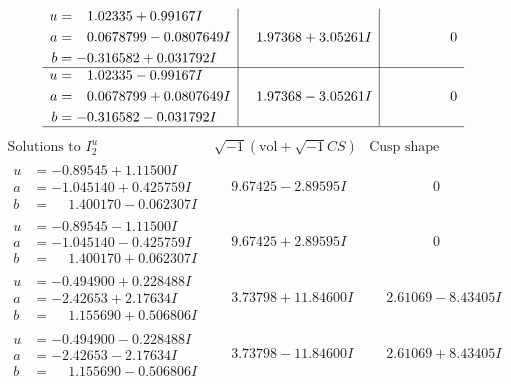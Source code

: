 \documentclass[1p]{elsarticle_modified}
\theoremstyle{definition}
\newcommand{\I}{\sqrt{-1}}
\begin{document}
$$\begin{array}{c|c|c}
\begin{aligned}
u &= \phantom{-}1.02335 + 0.99167 I \\
a &= \phantom{-}0.0678799 - 0.0807649 I \\
b &= -0.316582 + 0.031792 I\end{aligned}
 & \phantom{-}1.97368 + 3.05261 I & \phantom{-0.000000 } 0 \\ \hline\begin{aligned}
u &= \phantom{-}1.02335 - 0.99167 I \\
a &= \phantom{-}0.0678799 + 0.0807649 I \\
b &= -0.316582 - 0.031792 I\end{aligned}
 & \phantom{-}1.97368 - 3.05261 I & \phantom{-0.000000 } 0\\
 \hline 
 \end{array}$$\newpage$$\begin{array}{c|c|c}  
\text{Solutions to }I^u_{2}& \I (\text{vol} + \sqrt{-1}CS) & \text{Cusp shape}\\
 \hline 
\begin{aligned}
u &= -0.89545 + 1.11500 I \\
a &= -1.045140 + 0.425759 I \\
b &= \phantom{-}1.400170 - 0.062307 I\end{aligned}
 & \phantom{-}9.67425 - 2.89595 I & \phantom{-0.000000 } 0 \\ \hline\begin{aligned}
u &= -0.89545 - 1.11500 I \\
a &= -1.045140 - 0.425759 I \\
b &= \phantom{-}1.400170 + 0.062307 I\end{aligned}
 & \phantom{-}9.67425 + 2.89595 I & \phantom{-0.000000 } 0 \\ \hline\begin{aligned}
u &= -0.494900 + 0.228488 I \\
a &= -2.42653 + 2.17634 I \\
b &= \phantom{-}1.155690 + 0.506806 I\end{aligned}
 & \phantom{-}3.73798 + 11.84600 I & \phantom{-}2.61069 - 8.43405 I \\ \hline\begin{aligned}
u &= -0.494900 - 0.228488 I \\
a &= -2.42653 - 2.17634 I \\
b &= \phantom{-}1.155690 - 0.506806 I\end{aligned}
 & \phantom{-}3.73798 - 11.84600 I & \phantom{-}2.61069 + 8.43405 I \\ \hline\begin{aligned}

\end{aligned}
\end{array}$$
\end{document}
